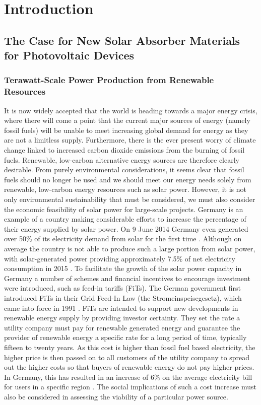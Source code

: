 \chapter{Introduction}

\section{The Case for New Solar Absorber Materials for Photovoltaic Devices}

\subsection{Terawatt-Scale Power Production from Renewable Resources}

It is now widely accepted that the world is heading towards a major energy crisis, where there will come a point that the current major sources of energy (namely fossil fuels) will be unable to meet increasing global demand for energy as they are not a limitless supply. Furthermore, there is the ever present worry of climate change linked to increased carbon dioxide emissions from the burning of fossil fuels. Renewable, low-carbon alternative energy sources are therefore clearly desirable. From purely environmental considerations, it seems clear that fossil fuels should no longer be used and we should meet our energy needs solely from renewable, low-carbon energy resources such as solar power. However, it is not only environmental sustainability that must be considered, we must also consider the economic feasibility of solar power for large-scale projects. Germany is an example of a country making considerable efforts to increase the percentage of their energy supplied by solar power. On 9 June 2014 Germany even generated over 50\% of its electricity demand from solar for the first time \cite{Germany_guardian_news}. Although on average the country is not able to produce such a large portion from solar power, with solar-generated power providing approximately 7.5\% of net electricity consumption in 2015 \cite{Germany_PV}. To facilitate the growth of the solar power capacity in Germany a number of schemes and financial incentives to encourage investment were introduced, such as feed-in tariffs (FiTs).
The German government first introduced FiTs in their Grid Feed-In Law (the Stromeinspeisegesetz), which came into force in 1991 \cite{Germany_Lang}. FiTs are intended to support new developments in renewable energy supply by providing investor certainty. They set the rate a utility company must pay for renewable generated energy and guarantee the provider of renewable energy a specific rate for a long period of time, typically fifteen to twenty years. As this cost is higher than fossil fuel based electricity, the higher price is then passed on to all customers of the utility company to spread out the higher costs so that buyers of renewable energy do not pay higher prices. In Germany, this has resulted in an increase of 6\% on the average electricity bill for users in a specific region \cite{Germany_Oregon}. The social implications of such a cost increase must also be considered in assessing the viability of a particular power source.\\

